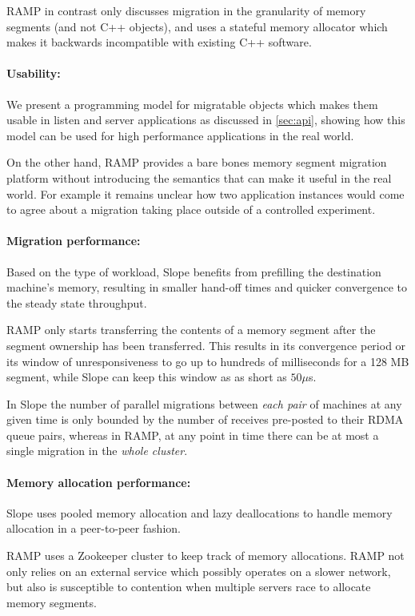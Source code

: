 RAMP in contrast only discusses migration in the granularity of memory segments
(and not C++ objects), and uses a stateful memory allocator which makes it
backwards incompatible with existing C++ software.

\paragraph{Usability:}
We present a programming model for migratable objects which makes them
usable in listen and server applications as discussed in
\autoref{sec:api}, showing how this model can be used for high performance
applications in the real world.

On the other hand, RAMP provides a bare bones memory segment migration
platform without introducing the semantics that can make it useful in the real world.
For example it remains unclear how two application instances would come to
agree about a migration taking place outside of a controlled experiment.

\paragraph{Migration performance:}
Based on the type of workload, Slope benefits from prefilling the
destination machine's memory, resulting in smaller hand-off times and
quicker convergence to the steady state throughput.


RAMP only starts transferring the contents of a memory segment after
the segment ownership has been transferred. This results in its
convergence period or its window of unresponsiveness to go up to hundreds
of milliseconds for a 128 MB segment, while Slope can keep this window as
as short as $50\mu$s.

In Slope the number of parallel migrations between \emph{each pair}
of machines at any given time is only bounded by the number of receives
pre-posted to their RDMA queue pairs, whereas in RAMP, at any point in time
there can be at most a single migration in the \emph{whole cluster}.


\paragraph{Memory allocation performance:}
Slope uses pooled memory allocation and lazy deallocations to handle
memory allocation in a peer-to-peer fashion.

RAMP uses a Zookeeper cluster to keep track of memory allocations.
RAMP not only relies on an external service which possibly
operates on a slower network, but also is susceptible to contention
when multiple servers race to allocate memory segments.



